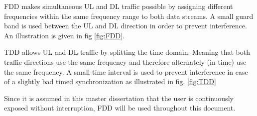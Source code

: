 \gls{FDD} makes simultaneous \gls{UL} and \gls{DL} traffic possible by assigning different frequencies within the same frequency range 
to both data streams. A small guard band is used between the \gls{UL} and \gls{DL} direction in order to prevent interference. An illustration 
is given in fig \ref{fig:FDD}.

\gls{TDD} allows  \gls{UL} and \gls{DL} traffic by splitting the time domain. Meaning that both traffic directions use the same frequency and therefore
alternately (in time) use the same frequency. A small time interval is used to prevent interference in case of a slightly bad timed synchronization as 
illustrated in fig. \ref{fig:TDD}

Since it is assumed in this master dissertation that the user is continuously exposed without interruption, 
\gls{FDD} will be used throughout this document.

